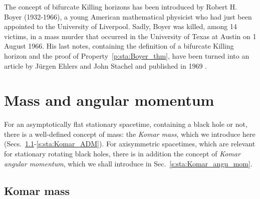 \begin{hist} \label{h:sta:Boyer}
The concept of bifurcate Killing horizons has been introduced by Robert H. Boyer
(1932-1966), a young American mathematical physicist who had just been appointed
to the University of Liverpool. Sadly, Boyer was killed, among 14 victims, in a mass murder that
occurred in the University of Texas at Austin on 1 August 1966.
His last notes, containing the definition of a bifurcate Killing horizon
and the proof of Property~\ref{p:sta:Boyer_thm}, have been turned into an article
by Jürgen Ehlers and John Stachel and published in 1969 \cite{Boyer69}.
\end{hist}



\section{Mass and angular momentum} \label{s:sta:mass_angul_mom}

For an asymptotically flat stationary spacetime, containing a
black hole or not, there is a well-defined concept of mass: the \emph{Komar mass},
which we introduce here (Secs.~\ref{s:sta:Komar_mass}-\ref{s:sta:Komar_ADM}).
For axisymmetric spacetimes, which are relevant
for stationary rotating black holes, there is in addition the concept
of \emph{Komar angular momentum}, which we shall introduce in Sec.~\ref{s:sta:Komar_angu_mom}.

\subsection{Komar mass} \label{s:sta:Komar_mass}

